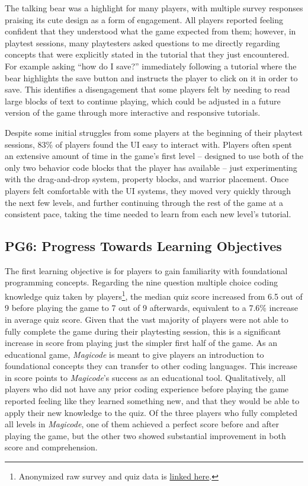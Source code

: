 \documentclass[10pt,twocolumn]{article}
\begin{document}
The talking bear was a highlight for many players, with multiple survey responses praising its cute design as a form of engagement. All players reported feeling confident that they understood what the game expected from them; however, in playtest sessions, many playtesters asked questions to me directly regarding concepts that were explicitly stated in the tutorial that they just encountered. For example asking “how do I save?” immediately following a tutorial where the bear highlights the save button and instructs the player to click on it in order to save. This identifies a disengagement that some players felt by needing to read large blocks of text to continue playing, which could be adjusted in a future version of the game through more interactive and responsive tutorials.

Despite some initial struggles from some players at the beginning of their playtest sessions, 83\% of players found the UI easy to interact with. Players often spent an extensive amount of time in the game’s first level – designed to use both of the only two behavior code blocks that the player has available – just experimenting with the drag-and-drop system, property blocks, and warrior placement. Once players felt comfortable with the UI systems, they moved very quickly through the next few levels, and further continuing through the rest of the game at a consistent pace, taking the time needed to learn from each new level’s tutorial.

\subsection{PG6: Progress Towards Learning Objectives}
The first learning objective is for players to gain familiarity with foundational programming concepts. Regarding the nine question multiple choice coding knowledge quiz taken by players\footnote{Anonymized raw survey and quiz data is \href{https://docs.google.com/spreadsheets/d/1F7b50xaFvfE2F1knakdCm4rHaRKITp1pA6s78goNYoM/edit?usp=sharing}{linked here}.}, the median quiz score increased from 6.5 out of 9 before playing the game to 7 out of 9 afterwards, equivalent to a 7.6\% increase in average quiz score. Given that the vast majority of players were not able to fully complete the game during their playtesting session, this is a significant increase in score from playing just the simpler first half of the game. As an educational game, \textit{Magicode} is meant to give players an introduction to foundational concepts they can transfer to other coding languages. This increase in score points to \textit{Magicode}’s success as an educational tool. Qualitatively, all players who did not have any prior coding experience before playing the game reported feeling like they learned something new, and that they would be able to apply their new knowledge to the quiz. Of the three players who fully completed all levels in \textit{Magicode}, one of them achieved a perfect score before and after playing the game, but the other two showed substantial improvement in both score and comprehension.
\end{document}
